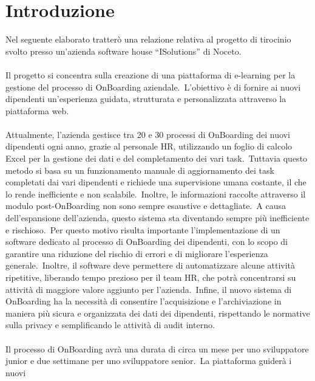 \chapter*{Introduzione}\label{chapter:introduzione} %
Nel seguente elaborato tratterò una relazione relativa al progetto di tirocinio svolto 
presso un'azienda software house “ISolutions” di Noceto.
\\ \\
Il progetto si concentra sulla creazione di una piattaforma di e-learning per la 
gestione del processo di OnBoarding aziendale.\ L'obiettivo è di fornire ai nuovi 
dipendenti un'esperienza guidata, strutturata e personalizzata attraverso la 
piattaforma web. 
\\ \\
Attualmente, l'azienda gestisce tra 20 e 30 processi di OnBoarding dei nuovi 
dipendenti ogni anno, grazie al personale HR, utilizzando un foglio di calcolo Excel 
per la gestione dei dati e del completamento dei vari task.\ Tuttavia questo metodo si 
basa su un funzionamento manuale di aggiornamento dei task completati dai vari 
dipendenti e richiede una supervisione umana costante, il che lo rende inefficiente e 
non scalabile.\ Inoltre, le informazioni raccolte attraverso il modulo post-OnBoarding 
non sono sempre esaustive e dettagliate.\ A causa dell'espansione dell'azienda, 
questo sistema sta diventando sempre più inefficiente e rischioso.\ Per questo motivo 
risulta importante l'implementazione di un software dedicato al processo di 
OnBoarding dei dipendenti, con lo scopo di garantire una riduzione del rischio di 
errori e di migliorare l'esperienza generale.\ Inoltre, il software deve permettere di 
automatizzare alcune attività ripetitive, liberando tempo prezioso per il team HR, che 
potrà concentrarsi su attività di maggiore valore aggiunto per l'azienda.\ Infine, il 
nuovo sistema di OnBoarding ha la necessità di consentire l'acquisizione e 
l'archiviazione in maniera più sicura e organizzata dei dati dei dipendenti, 
rispettando le normative sulla privacy e semplificando le attività di audit interno.
\\ \\
Il processo di OnBoarding avrà una durata di circa un mese per uno sviluppatore 
junior e due settimane per uno sviluppatore senior.\ La piattaforma guiderà i nuovi 
